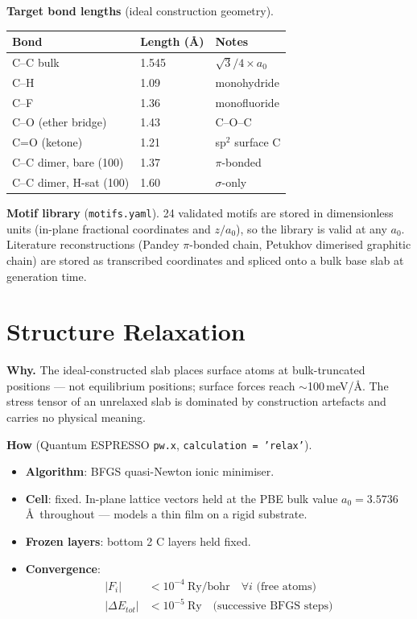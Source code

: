 \documentclass[11pt]{article}
\begin{document}
\textbf{Target bond lengths} (ideal construction geometry).

\begin{center}
\begin{tabular}{lll}
\toprule
Bond & Length (\AA) & Notes \\
\midrule
C--C bulk & 1.545 & $\sqrt{3}/4 \times a_0$ \\
C--H & 1.09 & monohydride \\
C--F & 1.36 & monofluoride \\
C--O (ether bridge) & 1.43 & C--O--C \\
C=O (ketone) & 1.21 & sp$^2$ surface C \\
C--C dimer, bare (100) & 1.37 & $\pi$-bonded \\
C--C dimer, H-sat (100) & 1.60 & $\sigma$-only \\
\bottomrule
\end{tabular}
\end{center}

\textbf{Motif library} (\texttt{motifs.yaml}). 24 validated motifs are stored in dimensionless units (in-plane fractional coordinates and $z/a_0$), so the library is valid at any $a_0$. Literature reconstructions (Pandey $\pi$-bonded chain, Petukhov dimerised graphitic chain) are stored as transcribed coordinates and spliced onto a bulk base slab at generation time.

\section{Structure Relaxation}

\textbf{Why.} The ideal-constructed slab places surface atoms at bulk-truncated positions --- not equilibrium positions; surface forces reach $\sim$100\,meV/\AA. The stress tensor of an unrelaxed slab is dominated by construction artefacts and carries no physical meaning.

\textbf{How} (Quantum ESPRESSO \texttt{pw.x}, \texttt{calculation = 'relax'}).
\begin{itemize}
  \item \textbf{Algorithm}: BFGS quasi-Newton ionic minimiser.
  \item \textbf{Cell}: fixed. In-plane lattice vectors held at the PBE bulk value $a_0 = 3.5736$\,\AA\ throughout --- models a thin film on a rigid substrate.
  \item \textbf{Frozen layers}: bottom 2 C layers held fixed.
  \item \textbf{Convergence}:
\begin{align}
|F_i| &< 10^{-4}\ \text{Ry/bohr} \quad \forall i \text{ (free atoms)} \\
|\Delta E_{tot}| &< 10^{-5}\ \text{Ry} \quad \text{(successive BFGS steps)}
\end{align}
\end{itemize}
\end{document}
